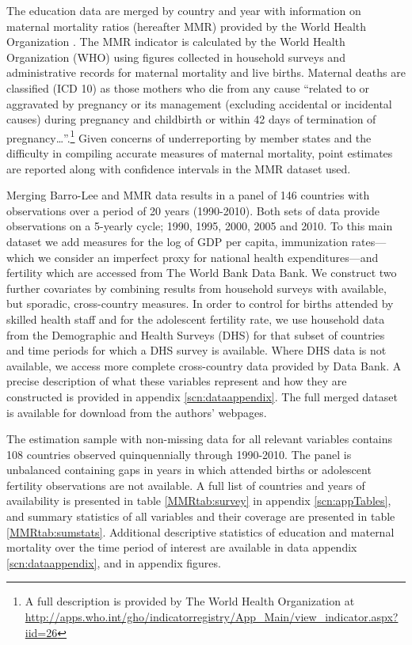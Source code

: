 \documentclass{article}[12pt,subeqn]
\begin{document}
\begin{spacing}{1.4}
The education data are merged by country and year with information on maternal 
mortality ratios (hereafter MMR) provided by the World Health Organization 
\citep{WHO2012}. The MMR indicator is calculated by the World Health 
Organization (WHO) using figures collected in household surveys and 
administrative records for maternal mortality and live births. Maternal 
deaths are classified (ICD 10) as those mothers who die from any cause ``related 
to or aggravated by pregnancy or its management (excluding accidental or 
incidental causes) during pregnancy and childbirth or within 42 days of 
termination of pregnancy\ldots''.\footnote{A full description is provided by 
The World Health Organization at 
\url{http://apps.who.int/gho/indicatorregistry/App_Main/view_indicator.aspx?iid=26}} 
Given concerns of underreporting by member states and the difficulty in compiling 
accurate measures of maternal mortality, point estimates are reported along with 
confidence intervals in the MMR dataset used.

Merging Barro-Lee and MMR data results in a panel of 146 countries with 
observations over a period of 20 years (1990-2010). Both sets of data provide 
observations on a 5-yearly cycle; 1990, 1995, 2000, 2005 and 2010. To this main 
dataset we add measures for the log of GDP per capita, immunization rates---which 
we consider an imperfect proxy for national health expenditures---and fertility 
which are accessed from The World Bank Data Bank. We construct two further 
covariates by combining results from household surveys with available, but
sporadic, cross-country measures. In order to control for births attended by skilled
health staff and for the adolescent fertility rate, we use household data from the
Demographic and Health Surveys (DHS) for that subset of countries and time periods for
which a DHS survey is available. Where DHS data is not available, we access more
complete cross-country data provided by \citet{WorldBank2012} Data Bank. A precise
description of what these variables represent and how they are constructed is
provided in appendix \ref{scn:dataappendix}.  The full merged dataset is available
for download from the authors' webpages.

The estimation sample with non-missing data for all relevant variables contains 
108 countries observed quinquennially through 1990-2010. The panel is unbalanced 
containing gaps in years in which attended births or adolescent fertility 
observations are not available. A full list of countries and years of 
availability is presented in table \ref{MMRtab:survey} in appendix 
\ref{scn:appTables}, and summary statistics of all variables and their coverage
are presented in table \ref{MMRtab:sumstats}.  Additional descriptive statistics
of education and maternal mortality over the time period of interest are available
in data appendix \ref{scn:dataappendix}, and in appendix figures.


\end{spacing}
\end{document}
